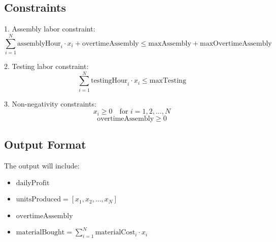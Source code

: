 \documentclass{article}
\begin{document}
\subsection*{Constraints}
1. Assembly labor constraint:
\[
\sum_{i=1}^{N} \text{assemblyHour}_i \cdot x_i + \text{overtimeAssembly} \leq \text{maxAssembly} + \text{maxOvertimeAssembly}
\]

2. Testing labor constraint:
\[
\sum_{i=1}^{N} \text{testingHour}_i \cdot x_i \leq \text{maxTesting}
\]

3. Non-negativity constraints:
\[
x_i \geq 0 \quad \text{for } i = 1, 2, \ldots, N
\]
\[
\text{overtimeAssembly} \geq 0
\]

\subsection*{Output Format}
The output will include:
\begin{itemize}
    \item \( \text{dailyProfit} \)
    \item \( \text{unitsProduced} = [x_1, x_2, \ldots, x_N] \)
    \item \( \text{overtimeAssembly} \)
    \item \( \text{materialBought} = \sum_{i=1}^{N} \text{materialCost}_i \cdot x_i \)
\end{itemize}
\end{document}
